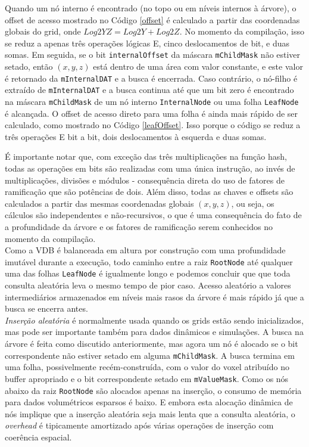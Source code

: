 \documentclass[12pt, a4paper, oneside]{book}
\begin{document}
Quando um nó interno é encontrado (no topo ou em níveis internos à árvore), o offset de acesso mostrado no Código \ref{offset} é calculado a partir das coordenadas globais do grid, onde $Log2YZ = Log2Y + Log2Z$. No momento da compilação, isso se reduz a apenas três operações lógicas E, cinco deslocamentos de bit, e duas somas. Em seguida, se o bit \texttt{internalOffset} da máscara \texttt{mChildMask} não estiver setado, então $(x, y, z)$ está dentro de uma área com valor constante, e este valor é retornado da \texttt{mInternalDAT} e a busca é encerrada. Caso contrário, o nó-filho é extraído de \texttt{mInternalDAT} e a busca continua até que um bit zero é encontrado na máscara \texttt{mChildMask} de um nó interno \texttt{InternalNode} ou uma folha \texttt{LeafNode} é alcançada. O offset de acesso direto para uma folha é ainda mais rápido de ser calculado, como mostrado no Código \ref{leafOffset}. Isso porque o código se reduz a três operações E bit a bit, dois deslocamentos à esquerda e duas somas.

É importante notar que, com exceção das três multiplicações na função hash, todas as operações em bits são realizadas com uma única instrução, ao invés de multiplicações, divisões e módulos - consequência direta do uso de fatores de ramificação que são potências de dois. Além disso, todas as chaves e offsets são calculados a partir das mesmas coordenadas globais $(x, y, z)$, ou seja, os cálculos são independentes e não-recursivos, o que é uma consequência do fato de a profundidade da árvore e os fatores de ramificação serem conhecidos no momento da compilação. \\



Como a VDB é balanceada em altura por construção com uma profundidade imutável durante a execução, todo caminho entre a raiz \texttt{RootNode} até qualquer uma das folhas \texttt{LeafNode} é igualmente longo e podemos concluir que que toda consulta aleatória leva o mesmo tempo de pior caso. Acesso aleatório a valores intermediários armazenados em níveis mais rasos da árvore é mais rápido já que a busca se encerra antes. \\

\emph{Inserção aleatória} é normalmente usada quando os grids estão sendo inicializados, mas pode ser importante também para dados dinâmicos e simulações. A busca na árvore é feita como discutido anteriormente, mas agora um nó é alocado se o bit correspondente não estiver setado em alguma \texttt{mChildMask}. A busca termina em uma folha, possivelmente recém-construída, com o valor do voxel atribuído no buffer apropriado e o bit correspondente setado em \texttt{mValueMask}. Como os nós abaixo da raiz \texttt{RootNode} são alocados apenas na inserção, o consumo de memória para dados volumétricos esparsos é baixo. E embora esta alocação dinâmica de nós implique que a inserção aleatória seja mais lenta que a consulta aleatória, o {\it overhead} é tipicamente amortizado após várias operações de inserção com coerência espacial. \\
\end{document}
